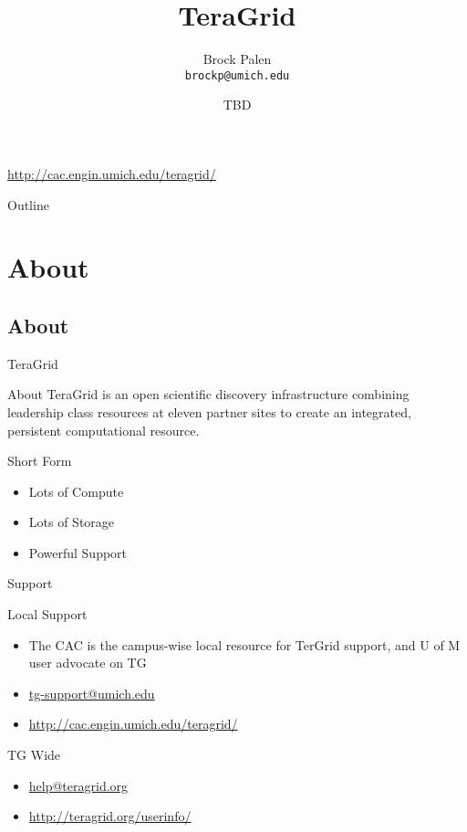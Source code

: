 \documentclass[handout]{beamer}
\title[CAC Intro] {TeraGrid}
\author{Brock Palen\\ \texttt{brockp@umich.edu}}
\date{TBD}
\begin{document}
  \begin{frame}
    \titlepage
    \url{http://cac.engin.umich.edu/teragrid/}
  \end{frame}

  \begin{frame}{Outline}
    \tableofcontents
  \end{frame}
  
  \section{About}
  \subsection {About}
  \begin{frame}{TeraGrid}
   \begin{block}{About}
    TeraGrid is an open scientific discovery infrastructure combining leadership class resources at eleven partner sites to create an integrated, persistent computational resource.
   \end{block}
   \begin{block}{Short Form}
    \begin{itemize}
     \item<2-> Lots of Compute
     \item<3-> Lots of Storage
     \item<4-> Powerful Support
    \end{itemize}
   \end{block}
  \end{frame}

  \begin{frame}{Support}
   \begin{block}{Local Support}
    \begin{itemize}
     \item The CAC is the campus-wise local resource for TerGrid support, and U of M user advocate on TG
     \item \url{tg-support@umich.edu}
     \item \url{http://cac.engin.umich.edu/teragrid/}
    \end{itemize}
   \end{block}
   \begin{block}{TG Wide}
    \begin{itemize}
     \item \url{help@teragrid.org}
     \item \url{http://teragrid.org/userinfo/}
    \end{itemize}
   \end{block}
  \end{frame}
\end{document}
